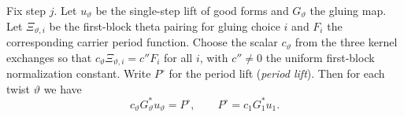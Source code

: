\begin{lemma}
\label{lem:c-period-adjoint}
\emitthmsource
Fix step $j$. Let $u_\vartheta$ be the single-step lift of good forms and $G_\vartheta$ the gluing map. Let $\Xi_{\vartheta,i}$ be the first-block theta pairing for gluing choice $i$ and $F_i$ the corresponding carrier period function. Choose the scalar $c_\vartheta$ from the three kernel exchanges so that $c_\vartheta\Xi_{\vartheta,i}=c''F_i$ for all $i$, with $c''\ne0$ the uniform first-block normalization constant. Write $P^\circ$ for the period lift (\emph{period lift}). Then for each twist $\vartheta$ we have
\[
 c_\vartheta G_\vartheta^*u_\vartheta=P^\circ,
 \qquad P^\circ=c_1G_1^*u_1 .
\]
\end{lemma}

